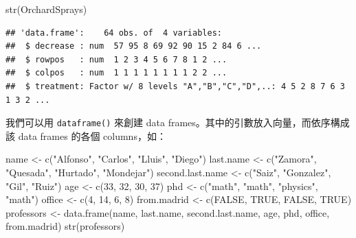 \documentclass[
]{book}
\newenvironment{Shaded}{\begin{snugshade}}{\end{snugshade}}
\newcommand{\ConstantTok}[1]{\textcolor[rgb]{0.00,0.00,0.00}{#1}}
\newcommand{\DecValTok}[1]{\textcolor[rgb]{0.00,0.00,0.81}{#1}}
\newcommand{\FunctionTok}[1]{\textcolor[rgb]{0.00,0.00,0.00}{#1}}
\newcommand{\NormalTok}[1]{#1}
\newcommand{\OtherTok}[1]{\textcolor[rgb]{0.56,0.35,0.01}{#1}}
\newcommand{\StringTok}[1]{\textcolor[rgb]{0.31,0.60,0.02}{#1}}
\theoremstyle{definition}
\theoremstyle{remark}
\begin{document}
\begin{Shaded}
\begin{Highlighting}[]
\FunctionTok{str}\NormalTok{(OrchardSprays)}
\end{Highlighting}
\end{Shaded}

\begin{verbatim}
## 'data.frame':    64 obs. of  4 variables:
##  $ decrease : num  57 95 8 69 92 90 15 2 84 6 ...
##  $ rowpos   : num  1 2 3 4 5 6 7 8 1 2 ...
##  $ colpos   : num  1 1 1 1 1 1 1 1 2 2 ...
##  $ treatment: Factor w/ 8 levels "A","B","C","D",..: 4 5 2 8 7 6 3 1 3 2 ...
\end{verbatim}

我們可以用 \texttt{dataframe()} 來創建 data frames。其中的引數放入向量，而依序構成該 data frames 的各個 columns，如：

\begin{Shaded}
\begin{Highlighting}[]
\NormalTok{name }\OtherTok{\textless{}{-}} \FunctionTok{c}\NormalTok{(}\StringTok{"Alfonso"}\NormalTok{, }\StringTok{"Carlos"}\NormalTok{, }\StringTok{"Lluis"}\NormalTok{, }\StringTok{"Diego"}\NormalTok{)}
\NormalTok{last.name }\OtherTok{\textless{}{-}} \FunctionTok{c}\NormalTok{(}\StringTok{"Zamora"}\NormalTok{, }\StringTok{"Quesada"}\NormalTok{, }\StringTok{"Hurtado"}\NormalTok{, }\StringTok{"Mondejar"}\NormalTok{)}
\NormalTok{second.last.name }\OtherTok{\textless{}{-}} \FunctionTok{c}\NormalTok{(}\StringTok{"Saiz"}\NormalTok{, }\StringTok{"Gonzalez"}\NormalTok{, }\StringTok{"Gil"}\NormalTok{, }\StringTok{"Ruiz"}\NormalTok{)}
\NormalTok{age }\OtherTok{\textless{}{-}} \FunctionTok{c}\NormalTok{(}\DecValTok{33}\NormalTok{, }\DecValTok{32}\NormalTok{, }\DecValTok{30}\NormalTok{, }\DecValTok{37}\NormalTok{)}
\NormalTok{phd }\OtherTok{\textless{}{-}} \FunctionTok{c}\NormalTok{(}\StringTok{"math"}\NormalTok{, }\StringTok{"math"}\NormalTok{, }\StringTok{"physics"}\NormalTok{, }\StringTok{"math"}\NormalTok{)}
\NormalTok{office }\OtherTok{\textless{}{-}} \FunctionTok{c}\NormalTok{(}\DecValTok{4}\NormalTok{, }\DecValTok{14}\NormalTok{, }\DecValTok{6}\NormalTok{, }\DecValTok{8}\NormalTok{)}
\NormalTok{from.madrid }\OtherTok{\textless{}{-}} \FunctionTok{c}\NormalTok{(}\ConstantTok{FALSE}\NormalTok{, }\ConstantTok{TRUE}\NormalTok{, }\ConstantTok{FALSE}\NormalTok{, }\ConstantTok{TRUE}\NormalTok{)}
\NormalTok{professors }\OtherTok{\textless{}{-}} \FunctionTok{data.frame}\NormalTok{(name, last.name, second.last.name, age, phd, office, from.madrid)}
\FunctionTok{str}\NormalTok{(professors)}
\end{Highlighting}
\end{Shaded}
\end{document}
